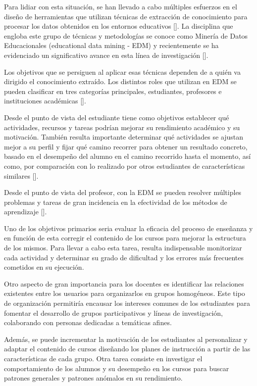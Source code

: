 Para lidiar con esta situación, se han llevado a cabo múltiples esfuerzos en el diseño de herramientas que utilizan técnicas de extracción de conocimiento para procesar los datos obtenidos en los entornos educativos [\cite{Sebastian}]. La disciplina que engloba este grupo de técnicas y metodologías se conoce como Minería de Datos Educacionales (educational data mining - EDM) y recientemente se ha evidenciado un significativo avance en esta línea de investigación [\cite{Vasile,Dominik}].  


Los objetivos que se persiguen al aplicar esas técnicas dependen de a quién va dirigido el conocimiento extraído. Los distintos roles que utilizan en EDM se pueden clasificar en tres categorías principales, estudiantes, profesores e instituciones académicas [\cite{Sebastian}].  


Desde el punto de vista del estudiante tiene como objetivos establecer qué actividades, recursos y tareas podrían mejorar su rendimiento académico y su motivación. También resulta importante determinar qué actividades se ajustan mejor a su perfil y fijar qué camino recorrer para obtener un resultado concreto, basado en el desempeño del alumno en el camino recorrido hasta el momento, así como, por comparación con lo realizado por otros estudiantes
de características similares [\cite{Sebastian}].  


Desde el punto de vista del profesor, con la EDM se pueden resolver múltiples problemas y tareas de gran incidencia en la efectividad de los métodos de aprendizaje [\cite{Sebastian}].  


Uno de los objetivos primarios seria evaluar la eficacia del proceso de enseñanza y en función de esta corregir el contenido de los cursos para mejorar la estructura de los mismos. Para llevar a cabo esta tarea, resulta indispensable monitorizar cada actividad y determinar su grado de dificultad y los errores más frecuentes cometidos en su ejecución.  


Otro aspecto de gran importancia para los docentes es identificar las relaciones existentes entre los usuarios para organizarlos en grupos homogéneos. Este tipo de organización permitiría encausar los intereses comunes de los estudiantes para fomentar el desarrollo de grupos participativos y líneas de investigación, colaborando con personas dedicadas a temáticas afines.  


Además, se puede incrementar la motivación de los estudiantes al personalizar y adaptar el contenido de cursos diseñando los planes de instrucción a partir de las características de cada grupo. Otra tarea consiste en investigar el comportamiento de los alumnos y su desempeño en los cursos para buscar patrones generales y patrones anómalos en su rendimiento.  


